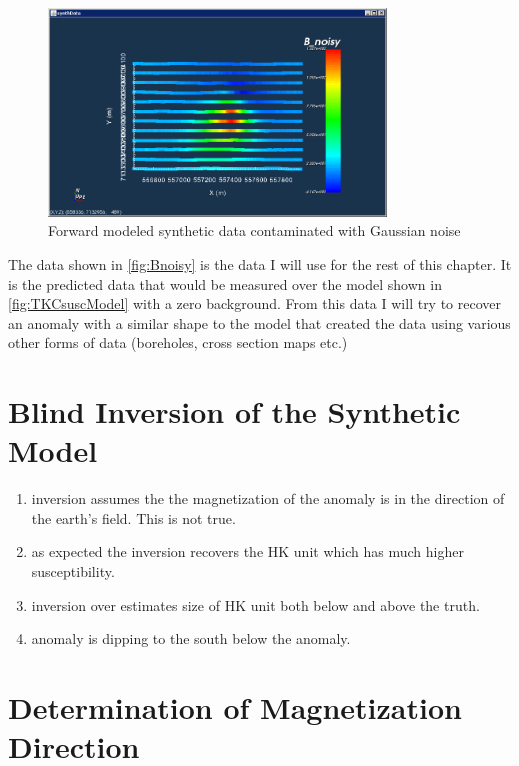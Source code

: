 \begin{figure} [h]
   \centering
   \includegraphics[width=0.8\textwidth]{images/TKC/Bnoisy.PNG}
   \caption{Forward modeled synthetic data contaminated with Gaussian noise}
   \label{fig:Bnoisy}
\end{figure}

The data shown in \autoref{fig:Bnoisy} is the data I will use for the rest of this chapter. It is the predicted data that would be measured over the model shown in \autoref{fig:TKCsuscModel} with a zero background. From this data I will try to recover an anomaly with a similar shape to the model that created the data using various other forms of data (boreholes, cross section maps etc.)


\FloatBarrier
\section{Blind Inversion of the Synthetic Model}
\label{sec:Blind Inversion of the Synthetic Model:TKC}

\begin{enumerate}
  \item inversion assumes the the magnetization of the anomaly is in the direction of the earth's field. This is not true.
  \item as expected the inversion recovers the HK unit which has much higher susceptibility.
  \item inversion over estimates size of HK unit both below and above the truth.
  \item anomaly is dipping to the south below the anomaly.
\end{enumerate}


\section{Determination of Magnetization Direction}
\label{sec:Determination of Magnetization Dirrection}


